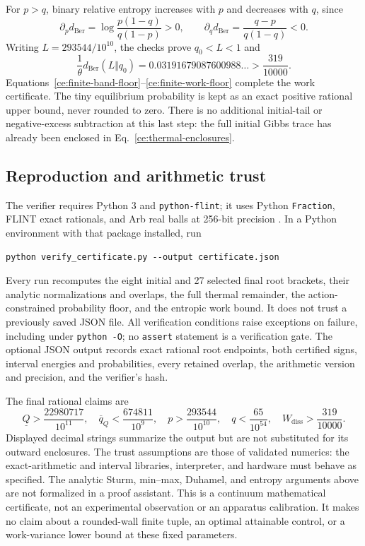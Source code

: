 \documentclass[aps,prl,reprint,superscriptaddress,longbibliography]{revtex4-2}
\begin{document}
For $p>q$, binary relative entropy increases with $p$ and decreases with
$q$, since
\begin{equation}
 \partial_p d_{\mathrm{Ber}}
   =\log\frac{p(1-q)}{q(1-p)}>0,\qquad
 \partial_q d_{\mathrm{Ber}}
   =\frac{q-p}{q(1-q)}<0.
 \label{ce:monotonicity}
\end{equation}
Writing $L=293544/10^{10}$, the checks prove $q_0<L<1$ and
\begin{equation}
 \frac1\theta d_{\mathrm{Ber}}(L\Vert q_0)
 =0.03191679087600988\ldots
 >\frac{319}{10000}.
 \label{ce:finite-work-floor}
\end{equation}
Equations~\eqref{ce:finite-band-floor}--\eqref{ce:finite-work-floor}
complete the work certificate. The tiny equilibrium probability is kept
as an exact positive rational upper bound, never rounded to zero.
There is no additional initial-tail or negative-excess subtraction at
this last step: the full initial Gibbs trace has already been enclosed
in Eq.~\eqref{ce:thermal-enclosures}.

\subsection{Reproduction and arithmetic trust}

The verifier requires Python 3 and \texttt{python-flint}; it uses Python
\texttt{Fraction}, FLINT exact rationals, and Arb real balls at 256-bit
precision \cite{Johansson}. In a Python environment with that package
installed, run
\begin{verbatim}
python verify_certificate.py --output certificate.json
\end{verbatim}
Every run recomputes the eight initial and 27 selected final root
brackets, their analytic normalizations and overlaps, the full thermal
remainder, the action-constrained probability floor, and the entropic
work bound. It does not trust a previously saved JSON file. All
verification conditions raise exceptions on failure, including under
\texttt{python -O}; no \texttt{assert} statement is a verification gate.
The optional JSON output records exact rational root endpoints, both
certified signs, interval energies and probabilities, every retained
overlap, the arithmetic version and precision, and the verifier's hash.

The final rational claims are
\begin{equation}
 \underline Q>\frac{22980717}{10^{11}},\quad
 \overline q_Q<\frac{674811}{10^9},\quad
 p>\frac{293544}{10^{10}},\quad
 q<\frac{65}{10^{54}},\quad
 W_{\mathrm{diss}}>\frac{319}{10000}.
 \label{ce:rational-summary}
\end{equation}
Displayed decimal strings summarize the output but are not substituted
for its outward enclosures. The trust assumptions are those of
validated numerics: the exact-arithmetic and interval libraries,
interpreter, and hardware must behave as specified. The analytic
Sturm, min--max, Duhamel, and entropy arguments above are not formalized
in a proof assistant. This is a continuum mathematical certificate, not
an experimental observation or an apparatus calibration. It makes no
claim about a rounded-wall finite tuple, an optimal attainable control,
or a work-variance lower bound at these fixed parameters.
\end{document}
